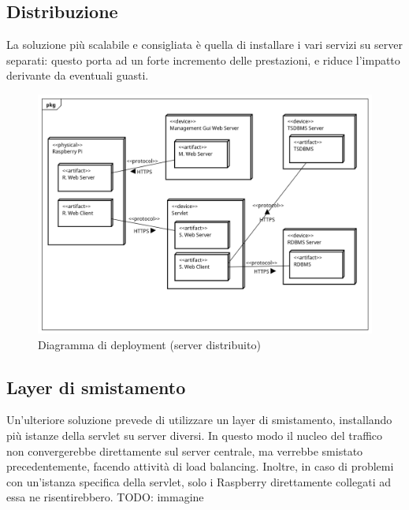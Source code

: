 \subsection{Distribuzione}
La soluzione più scalabile e consigliata è quella di installare i vari servizi su server separati: questo porta ad un forte incremento delle prestazioni, e riduce l'impatto derivante da eventuali guasti.
\begin{figure}[tbp]
	\centering
	\includegraphics[scale=.45]{figure/Deployment_Diagram_1.png}
	\caption{Diagramma di deployment (server distribuito) \label{DD DIST}}
\end{figure}
\subsection{Layer di smistamento}
Un'ulteriore soluzione prevede di utilizzare un layer di smistamento, installando più istanze della servlet su server diversi. In questo modo il nucleo del traffico non convergerebbe direttamente sul server centrale, ma verrebbe smistato precedentemente, facendo attività di load balancing. Inoltre, in caso di problemi con un'istanza specifica della servlet, solo i Raspberry direttamente collegati ad essa ne risentirebbero.
TODO: immagine